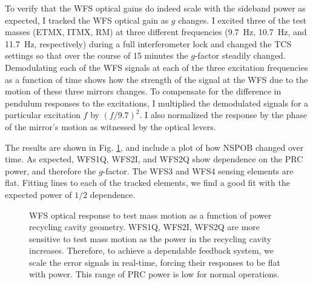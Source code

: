 To verify that the WFS optical gains do indeed scale with the sideband
power as expected, I tracked the WFS optical gain as $g$ changes. I
excited three of the test masses (ETMX, ITMX, RM) at three different
frequencies (9.7~Hz, 10.7~Hz, and 11.7~Hz, respectively) during a full
interferometer lock and changed the TCS settings so that over the
course of 15 minutes the $g$-factor steadily changed. Demodulating
each of the WFS signals at each of the three excitation frequencies as
a function of time shows how the strength of the signal at the WFS due
to the motion of these three mirrors changes. To compensate for the
difference in pendulum responses to the excitations, I multiplied the
demodulated signals for a particular excitation $f$ by $(f/9.7)^2$. I
also normalized the response by the phase of the mirror's motion as
witnessed by the optical levers.

The results are shown in Fig. \ref{fig:WFStrack}, and include a plot
of how NSPOB changed over time. As expected, WFS1Q, WFS2I, and WFS2Q
show dependence on the PRC power, and therefore the $g$-factor. The
WFS3 and WFS4 sensing elements are flat. Fitting lines to each of the
tracked elements, we find a good fit with the expected power of $1/2$
dependence. 

\begin{figure}
\begin{centering}
\caption[Measured dependence of the WFS error signals on the power
recycling cavity geometry]{WFS optical response to test mass motion as
  a function of power recycling cavity geometry. WFS1Q, WFS2I, WFS2Q
  are more sensitive to test mass motion as the power in the recycling
  cavity increases. Therefore, to achieve a dependable feedback
  system, we scale the error signals in real-time, forcing their
  responses to be flat with power. This range of PRC power is low for
  normal operations.}
\label{fig:WFStrack}
\end{centering}
\end{figure}


